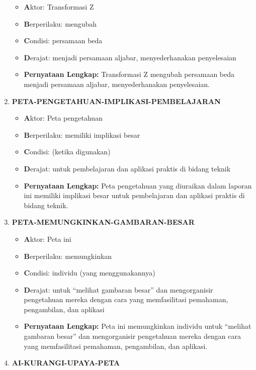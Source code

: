 \documentclass[
  letterpaper,
  DIV=11,
  numbers=noendperiod]{scrreprt}
\begin{document}
\begin{enumerate}
  \begin{itemize}
  \item
    \textbf{A}ktor: Transformasi Z
  \item
    \textbf{B}erperilaku: mengubah
  \item
    \textbf{C}ondisi: persamaan beda
  \item
    \textbf{D}erajat: menjadi persamaan aljabar, menyederhanakan
    penyelesaian
  \item
    \textbf{Pernyataan Lengkap:} Transformasi Z mengubah persamaan beda
    menjadi persamaan aljabar, menyederhanakan penyelesaian.
  \end{itemize}
\item
  \textbf{PETA-PENGETAHUAN-IMPLIKASI-PEMBELAJARAN}

  \begin{itemize}
  \item
    \textbf{A}ktor: Peta pengetahuan
  \item
    \textbf{B}erperilaku: memiliki implikasi besar
  \item
    \textbf{C}ondisi: (ketika digunakan)
  \item
    \textbf{D}erajat: untuk pembelajaran dan aplikasi praktis di bidang
    teknik
  \item
    \textbf{Pernyataan Lengkap:} Peta pengetahuan yang diuraikan dalam
    laporan ini memiliki implikasi besar untuk pembelajaran dan aplikasi
    praktis di bidang teknik.
  \end{itemize}
\item
  \textbf{PETA-MEMUNGKINKAN-GAMBARAN-BESAR}

  \begin{itemize}
  \item
    \textbf{A}ktor: Peta ini
  \item
    \textbf{B}erperilaku: memungkinkan
  \item
    \textbf{C}ondisi: individu (yang menggunakannya)
  \item
    \textbf{D}erajat: untuk ``melihat gambaran besar'' dan mengorganisir
    pengetahuan mereka dengan cara yang memfasilitasi pemahaman,
    pengambilan, dan aplikasi
  \item
    \textbf{Pernyataan Lengkap:} Peta ini memungkinkan individu untuk
    ``melihat gambaran besar'' dan mengorganisir pengetahuan mereka
    dengan cara yang memfasilitasi pemahaman, pengambilan, dan aplikasi.
  \end{itemize}
\item
  \textbf{AI-KURANGI-UPAYA-PETA}


\end{enumerate}
\end{document}

